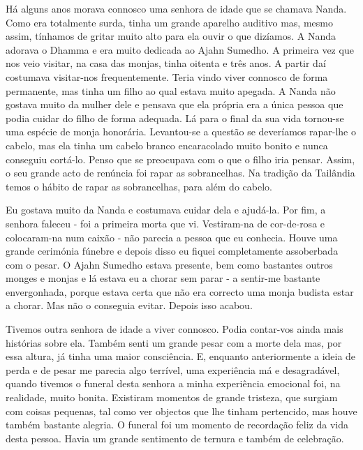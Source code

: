 Há alguns anos morava connosco uma senhora de idade que se chamava
Nanda. Como era totalmente surda, tinha um grande aparelho auditivo mas,
mesmo assim, tínhamos de gritar muito alto para ela ouvir o que
dizíamos. A Nanda adorava o Dhamma e era muito dedicada ao Ajahn
Sumedho. A primeira vez que nos veio visitar, na casa das monjas, tinha
oitenta e três anos. A partir daí costumava visitar-nos frequentemente.
Teria vindo viver connosco de forma permanente, mas tinha um filho ao
qual estava muito apegada. A Nanda não gostava muito da mulher dele e
pensava que ela própria era a única pessoa que podia cuidar do filho de
forma adequada. Lá para o final da sua vida tornou-se uma espécie de
monja honorária. Levantou-se a questão se deveríamos rapar-lhe o cabelo,
mas ela tinha um cabelo branco encaracolado muito bonito e nunca
conseguiu cortá-lo. Penso que se preocupava com o que o filho iria
pensar. Assim, o seu grande acto de renúncia foi rapar as sobrancelhas.
Na tradição da Tailândia temos o hábito de rapar as sobrancelhas, para
além do cabelo.

Eu gostava muito da Nanda e costumava cuidar dela e ajudá-la. Por fim, a
senhora faleceu - foi a primeira morta que vi. Vestiram-na de
cor-de-rosa e colocaram-na num caixão - não parecia a pessoa que eu
conhecia. Houve uma grande cerimónia fúnebre e depois disso eu fiquei
completamente assoberbada com o pesar. O Ajahn Sumedho estava presente,
bem como bastantes outros monges e monjas e lá estava eu a chorar sem
parar - a sentir-me bastante envergonhada, porque estava certa que não
era correcto uma monja budista estar a chorar. Mas não o conseguia
evitar. Depois isso acabou.

Tivemos outra senhora de idade a viver connosco. Podia contar-vos ainda
mais histórias sobre ela. Também senti um grande pesar com a morte dela
mas, por essa altura, já tinha uma maior consciência. E, enquanto
anteriormente a ideia de perda e de pesar me parecia algo terrível, uma
experiência má e desagradável, quando tivemos o funeral desta senhora a
minha experiência emocional foi, na realidade, muito bonita. Existiram
momentos de grande tristeza, que surgiam com coisas pequenas, tal como
ver objectos que lhe tinham pertencido, mas houve também bastante
alegria. O funeral foi um momento de recordação feliz da vida desta
pessoa. Havia um grande sentimento de ternura e também de celebração.

